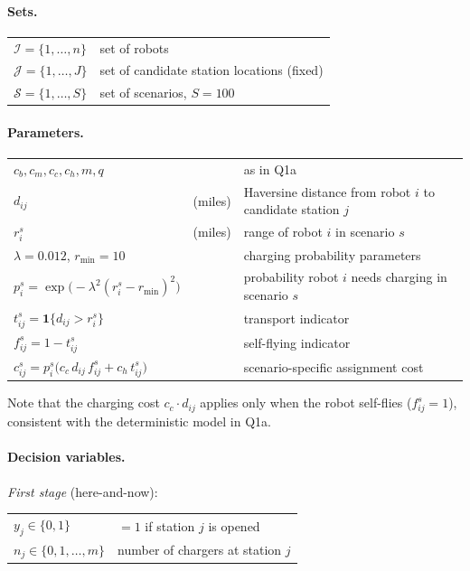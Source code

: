 \documentclass[11pt,a4paper]{article}
\begin{document}
\paragraph{Sets.}
\begin{tabular}{@{}ll@{}}
$\mathcal{I} = \{1,\dots,n\}$  & set of robots \\
$\mathcal{J} = \{1,\dots,J\}$  & set of candidate station locations (fixed) \\
$\mathcal{S} = \{1,\dots,S\}$  & set of scenarios, $S = 100$
\end{tabular}

\medskip
\paragraph{Parameters.}
\begin{tabular}{@{}lll@{}}
$c_b, c_m, c_c, c_h, m, q$ &  & as in Q1a \\
$d_{ij}$ & (miles) & Haversine distance from robot $i$ to candidate station $j$ \\
$r_i^s$  & (miles) & range of robot $i$ in scenario $s$ \\
$\lambda = 0.012$,\; $r_{\min} = 10$  & & charging probability parameters \\
$p_i^s = \exp\!\bigl(-\lambda^2 (r_i^s - r_{\min})^2\bigr)$ & & probability robot $i$ needs charging in scenario $s$ \\
$t_{ij}^s = \mathbf{1}\{d_{ij} > r_i^s\}$ & & transport indicator \\
$f_{ij}^s = 1 - t_{ij}^s$ & & self-flying indicator \\
$c_{ij}^s = p_i^s \bigl(c_c \, d_{ij} \, f_{ij}^s + c_h \, t_{ij}^s\bigr)$ & & scenario-specific assignment cost
\end{tabular}

\medskip
\noindent
Note that the charging cost $c_c \cdot d_{ij}$ applies only when the robot self-flies ($f_{ij}^s = 1$), consistent with the deterministic model in Q1a.

\medskip
\paragraph{Decision variables.}

\noindent\textit{First stage} (here-and-now):
\begin{tabular}{@{}ll@{}}
$y_j \in \{0,1\}$           & $= 1$ if station $j$ is opened \\
$n_j \in \{0,1,\dots,m\}$   & number of chargers at station $j$
\end{tabular}
\end{document}
